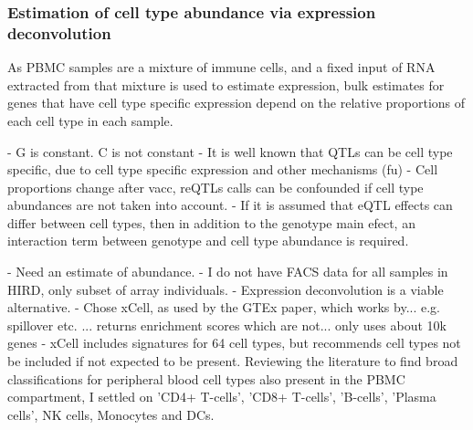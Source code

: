 
\subsubsection{Estimation of cell type abundance via expression deconvolution}

As \gls{PBMC} samples are a mixture of immune cells, and a fixed input of RNA extracted from that mixture is used to estimate expression, bulk estimates for genes that have cell type specific expression depend on the relative proportions of each cell type in each sample.

- G is constant. C is not constant
- It is well known that QTLs can be cell type specific, due to cell type specific expression and other mechanisms (fu)
- Cell proportions change after vacc, reQTLs calls can be confounded if cell type abundances are not taken into account.
- If it is assumed that eQTL effects can differ between cell types, then in addition to the genotype main efect, an interaction term between genotype and cell type abundance is required.

- Need an estimate of abundance.
- I do not have FACS data for all samples in HIRD, only subset of array individuals.
- Expression deconvolution is a viable alternative.
- Chose xCell, as used by the GTEx paper, which works by... e.g. spillover etc. ... returns enrichment scores which are not... only uses about 10k genes
- xCell includes signatures for 64 cell types, but recommends cell types not be included if not expected to be present.
Reviewing the literature to find broad classifications for peripheral blood cell types also present in the \gls{PBMC} compartment\autocite{davenport2018DiscoveringVivoCytokineeQTL},
I settled on 'CD4+ T-cells', 'CD8+ T-cells', 'B-cells', 'Plasma cells', NK cells, Monocytes and DCs.

